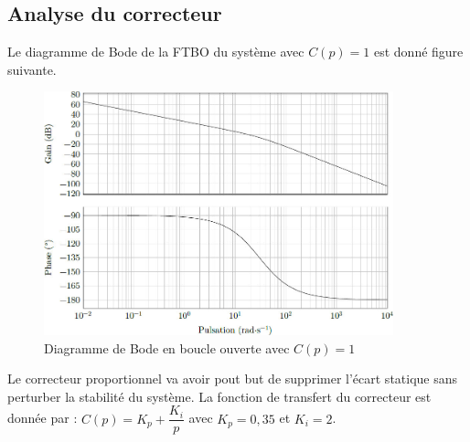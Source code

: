 \subsection{Analyse du correcteur}
Le diagramme de Bode de la FTBO du système avec $C(p)=1$ est donné figure suivante. 

\begin{figure}[!htb]
\begin{center}
\includegraphics[width=0.9\textwidth]{images/image_fig18.jpg}
\caption{Diagramme de Bode en boucle ouverte avec $C(p)=1$ \label{fig18}}
\end{center}
\end{figure}

\ifprof
\begin{corrige}
\end{corrige}
\else
\fi

Le correcteur proportionnel va avoir pout but de supprimer l'écart statique sans perturber la stabilité du système.
La fonction de transfert du correcteur est donnée par : $C(p)=K_p + \dfrac{K_i}{p}$ avec $K_p = 0,35$ et $K_i = 2$.

